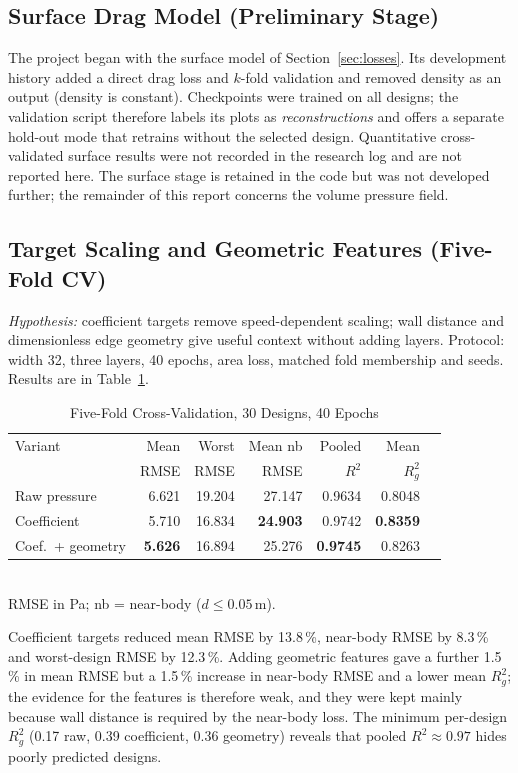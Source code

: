\documentclass[journal]{IEEEtran}
\newcommand{\hyp}[1]{\textit{Hypothesis:} #1}
\begin{document}
\subsection{Surface Drag Model (Preliminary Stage)}
The project began with the surface model of Section~\ref{sec:losses}. Its
development history added a direct drag loss and $k$-fold validation and
removed density as an output (density is constant). Checkpoints were trained on
all designs; the validation script therefore labels its plots as
\emph{reconstructions} and offers a separate hold-out mode that retrains without
the selected design. Quantitative cross-validated surface results were not
recorded in the research log and are not reported here. The surface stage is
retained in the code but was not developed further; the remainder of this
report concerns the volume pressure field.

\subsection{Target Scaling and Geometric Features (Five-Fold CV)}
\label{sec:exp_cv}
\hyp{coefficient targets remove speed-dependent scaling; wall distance and
dimensionless edge geometry give useful context without adding layers.}
Protocol: width 32, three layers, 40 epochs, area loss, matched fold membership
and seeds. Results are in Table~\ref{tab:cv}.

\begin{table}[!t]
\centering
\caption{Five-Fold Cross-Validation, 30 Designs, 40 Epochs}
\label{tab:cv}
\setlength{\tabcolsep}{3pt}
\begin{tabular}{lrrrrrr}
\toprule
Variant & Mean & Worst & Mean nb & Pooled & Mean \\
 & RMSE & RMSE & RMSE & $R^2$ & $R^2_g$ \\
\midrule
Raw pressure & 6.621 & 19.204 & 27.147 & 0.9634 & 0.8048 \\
Coefficient & 5.710 & 16.834 & \textbf{24.903} & 0.9742 & \textbf{0.8359} \\
Coef.\ + geometry & \textbf{5.626} & 16.894 & 25.276 & \textbf{0.9745} & 0.8263 \\
\bottomrule
\end{tabular}\\[2pt]
\footnotesize RMSE in Pa; nb = near-body ($d\le0.05$\,m).
\end{table}

Coefficient targets reduced mean RMSE by 13.8\,\%, near-body RMSE by 8.3\,\%
and worst-design RMSE by 12.3\,\%. Adding geometric features gave a further
1.5\,\% in mean RMSE but a 1.5\,\% increase in near-body RMSE and a lower mean
$R^2_g$; the evidence for the features is therefore weak, and they were kept
mainly because wall distance is required by the near-body loss.
The minimum per-design $R^2_g$ (0.17 raw, 0.39 coefficient, 0.36 geometry)
reveals that pooled $R^2\approx0.97$ hides poorly predicted designs.
\end{document}
